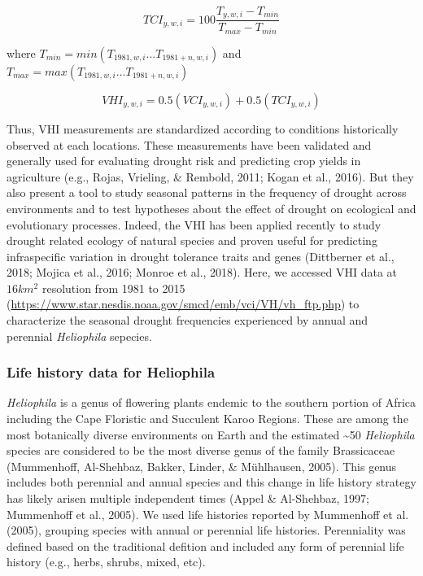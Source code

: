 \documentclass[man,floatsintext]{apa6}
\theoremstyle{definition}
\theoremstyle{definition}
\theoremstyle{definition}
\theoremstyle{remark}
\begin{document}
\[TCI_{y,w,i} = 100\frac{T_{y,w,i} - T_{min}}{T_{max} - T_{min}}\]

where \(T_{min} = min(T_{1981,w,i}...T_{1981+n,w,i})\) and
\(T_{max} = max(T_{1981,w,i}...T_{1981+n,w,i})\)

\[VHI_{y,w,i} = 0.5(VCI_{y,w,i}) + 0.5(TCI_{y,w,i})\]

Thus, VHI measurements are standardized according to conditions
historically observed at each locations. These measurements have been
validated and generally used for evaluating drought risk and predicting
crop yields in agriculture (e.g., Rojas, Vrieling, \& Rembold, 2011;
Kogan et al., 2016). But they also present a tool to study seasonal
patterns in the frequency of drought across environments and to test
hypotheses about the effect of drought on ecological and evolutionary
processes. Indeed, the VHI has been applied recently to study drought
related ecology of natural species and proven useful for predicting
infraspecific variation in drought tolerance traits and genes
(Dittberner et al., 2018; Mojica et al., 2016; Monroe et al., 2018).
Here, we accessed VHI data at \(16km^2\) resolution from 1981 to 2015
(\url{https://www.star.nesdis.noaa.gov/smcd/emb/vci/VH/vh_ftp.php}) to
characterize the seasonal drought frequencies experienced by annual and
perennial \emph{Heliophila} sepecies.

\hypertarget{life-history-data-for-heliophila}{%
\subsubsection{Life history data for
Heliophila}\label{life-history-data-for-heliophila}}

\emph{Heliophila} is a genus of flowering plants endemic to the southern
portion of Africa including the Cape Floristic and Succulent Karoo
Regions. These are among the most botanically diverse environments on
Earth and the estimated \textasciitilde{}50 \emph{Heliophila} species
are considered to be the most diverse genus of the family Brassicaceae
(Mummenhoff, Al-Shehbaz, Bakker, Linder, \& Mühlhausen, 2005). This
genus includes both perennial and annual species and this change in life
history strategy has likely arisen multiple independent times (Appel \&
Al-Shehbaz, 1997; Mummenhoff et al., 2005). We used life histories
reported by Mummenhoff et al. (2005), grouping species with annual or
perennial life histories. Perenniality was defined based on the
traditional defition and included any form of perennial life history
(e.g., herbs, shrubs, mixed, etc).
\end{document}
